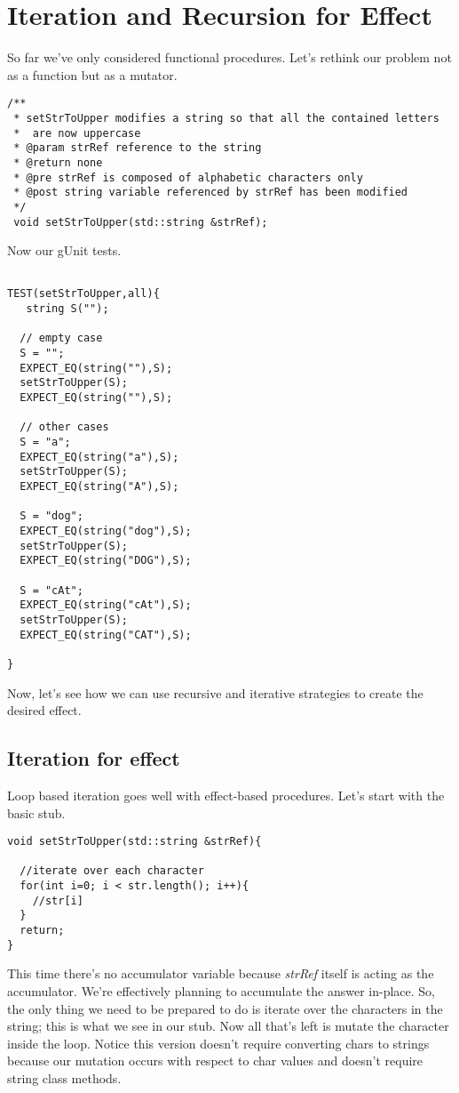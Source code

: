 \documentclass[]{tufte-handout}
\begin{document}
\section{Iteration and Recursion for Effect}

So far we've only considered functional procedures.  Let's rethink our problem not as a function but as a mutator.
\begin{verbatim}
/** 
 * setStrToUpper modifies a string so that all the contained letters 
 *  are now uppercase
 * @param strRef reference to the string
 * @return none
 * @pre strRef is composed of alphabetic characters only
 * @post string variable referenced by strRef has been modified
 */
 void setStrToUpper(std::string &strRef);
\end{verbatim}
Now our gUnit tests.
\begin{verbatim}

TEST(setStrToUpper,all){
   string S("");

  // empty case
  S = "";
  EXPECT_EQ(string(""),S);
  setStrToUpper(S);
  EXPECT_EQ(string(""),S);

  // other cases
  S = "a";
  EXPECT_EQ(string("a"),S);
  setStrToUpper(S);
  EXPECT_EQ(string("A"),S);

  S = "dog";
  EXPECT_EQ(string("dog"),S);
  setStrToUpper(S);
  EXPECT_EQ(string("DOG"),S);

  S = "cAt";
  EXPECT_EQ(string("cAt"),S);
  setStrToUpper(S);
  EXPECT_EQ(string("CAT"),S);          

}
\end{verbatim}

Now, let's see how we can use recursive and iterative strategies to create the desired effect.

\subsection{Iteration for effect}

Loop based iteration goes well with effect-based procedures.  Let's start with the basic stub.
\begin{verbatim}
void setStrToUpper(std::string &strRef){
 
  //iterate over each character
  for(int i=0; i < str.length(); i++){
	//str[i]
  }
  return;
}
\end{verbatim}
This time there's no accumulator variable because \textit{strRef} itself is acting as the accumulator.  We're effectively planning to accumulate the answer in-place.  So, the only thing we need to be prepared to do is iterate over the characters in the string; this is what we see in our stub. Now all that's left is mutate the character inside the loop.  Notice this version doesn't require converting chars to strings because our mutation occurs with respect to char values and doesn't require string class methods.
\end{document}
